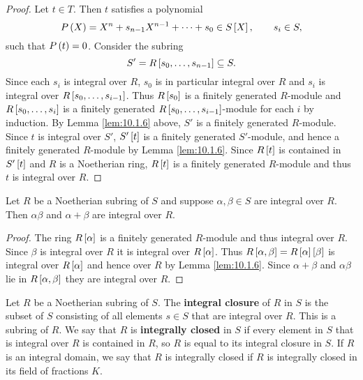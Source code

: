 \begin{proof}
Let $ t \in T $. Then $ t $ satisfies a polynomial
$$ P\rb{X} = X^n + s_{n - 1}X^{n - 1} + \dots + s_0 \in S\sb{X}, \qquad s_i \in S, $$
such that $ P\rb{t} = 0 $. Consider the subring
$$ S' = R\sb{s_0, \dots, s_{n - 1}} \subseteq S. $$
Since each $ s_i $ is integral over $ R $, $ s_0 $ is in particular integral over $ R $ and $ s_i $ is integral over $ R\sb{s_0, \dots, s_{i - 1}} $. Thus $ R\sb{s_0} $ is a finitely generated $ R $-module and $ R\sb{s_0, \dots, s_i} $ is a finitely generated $ R\sb{s_0, \dots, s_{i - 1}} $-module for each $ i $ by induction. By Lemma \ref{lem:10.1.6} above, $ S' $ is a finitely generated $ R $-module. Since $ t $ is integral over $ S' $, $ S'\sb{t} $ is a finitely generated $ S' $-module, and hence a finitely generated $ R $-module by Lemma \ref{lem:10.1.6}. Since $ R\sb{t} $ is contained in $ S'\sb{t} $ and $ R $ is a Noetherian ring, $ R\sb{t} $ is a finitely generated $ R $-module and thus $ t $ is integral over $ R $.
\end{proof}

\begin{corollary}
Let $ R $ be a Noetherian subring of $ S $ and suppose $ \alpha, \beta \in S $ are integral over $ R $. Then $ \alpha\beta $ and $ \alpha + \beta $ are integral over $ R $.
\end{corollary}

\begin{proof}
The ring $ R\sb{\alpha} $ is a finitely generated $ R $-module and thus integral over $ R $. Since $ \beta $ is integral over $ R $ it is integral over $ R\sb{\alpha} $. Thus $ R\sb{\alpha, \beta} = R\sb{\alpha}\sb{\beta} $ is integral over $ R\sb{\alpha} $ and hence over $ R $ by Lemma \ref{lem:10.1.6}. Since $ \alpha + \beta $ and $ \alpha\beta $ lie in $ R\sb{\alpha, \beta} $ they are integral over $ R $.
\end{proof}


\begin{definition}
Let $ R $ be a Noetherian subring of $ S $. The \textbf{integral closure} of $ R $ in $ S $ is the subset of $ S $ consisting of all elements $ s \in S $ that are integral over $ R $. This is a subring of $ R $. We say that $ R $ is \textbf{integrally closed} in $ S $ if every element in $ S $ that is integral over $ R $ is contained in $ R $, so $ R $ is equal to its integral closure in $ S $. If $ R $ is an integral domain, we say that $ R $ is integrally closed if $ R $ is integrally closed in its field of fractions $ K $.
\end{definition}

